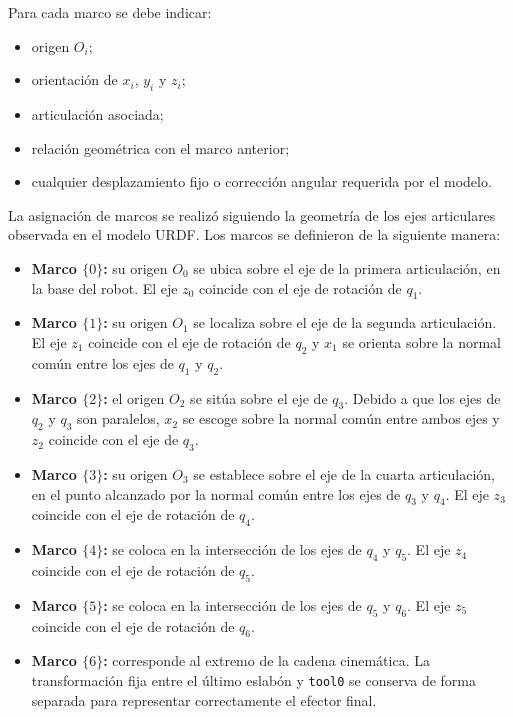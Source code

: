 \documentclass[journal]{IEEEtran}
\begin{document}
Para cada marco se debe indicar:

\begin{itemize}
    \item origen $O_i$;
    \item orientación de $x_i$, $y_i$ y $z_i$;
    \item articulación asociada;
    \item relación geométrica con el marco anterior;
    \item cualquier desplazamiento fijo o corrección angular requerida por el modelo.
\end{itemize}

La asignación de marcos se realizó siguiendo la geometría de los
ejes articulares observada en el modelo URDF. Los marcos se
definieron de la siguiente manera:

\begin{itemize}
    \item \textbf{Marco $\{0\}$:} su origen $O_0$ se ubica sobre
    el eje de la primera articulación, en la base del robot.
    El eje $z_0$ coincide con el eje de rotación de $q_1$.

    \item \textbf{Marco $\{1\}$:} su origen $O_1$ se localiza
    sobre el eje de la segunda articulación. El eje $z_1$
    coincide con el eje de rotación de $q_2$ y $x_1$ se orienta
    sobre la normal común entre los ejes de $q_1$ y $q_2$.

    \item \textbf{Marco $\{2\}$:} el origen $O_2$ se sitúa sobre
    el eje de $q_3$. Debido a que los ejes de $q_2$ y $q_3$
    son paralelos, $x_2$ se escoge sobre la normal común entre
    ambos ejes y $z_2$ coincide con el eje de $q_3$.

    \item \textbf{Marco $\{3\}$:} su origen $O_3$ se establece
    sobre el eje de la cuarta articulación, en el punto alcanzado
    por la normal común entre los ejes de $q_3$ y $q_4$.
    El eje $z_3$ coincide con el eje de rotación de $q_4$.

    \item \textbf{Marco $\{4\}$:} se coloca en la intersección
    de los ejes de $q_4$ y $q_5$. El eje $z_4$ coincide con
    el eje de rotación de $q_5$.

    \item \textbf{Marco $\{5\}$:} se coloca en la intersección
    de los ejes de $q_5$ y $q_6$. El eje $z_5$ coincide con
    el eje de rotación de $q_6$.

    \item \textbf{Marco $\{6\}$:} corresponde al extremo de la
    cadena cinemática. La transformación fija entre el último
    eslabón y \texttt{tool0} se conserva de forma separada para
    representar correctamente el efector final.
\end{itemize}
\end{document}
